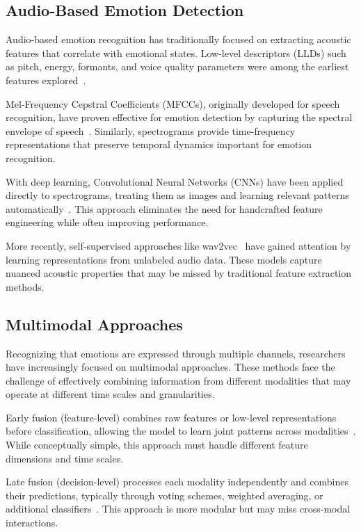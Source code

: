 \documentclass[12pt]{article}
\begin{document}
\subsection{Audio-Based Emotion Detection}
Audio-based emotion recognition has traditionally focused on extracting acoustic features that correlate with emotional states. Low-level descriptors (LLDs) such as pitch, energy, formants, and voice quality parameters were among the earliest features explored~\cite{schuller2009acoustic}.

Mel-Frequency Cepstral Coefficients (MFCCs), originally developed for speech recognition, have proven effective for emotion detection by capturing the spectral envelope of speech~\cite{li2013speech}. Similarly, spectrograms provide time-frequency representations that preserve temporal dynamics important for emotion recognition.

With deep learning, Convolutional Neural Networks (CNNs) have been applied directly to spectrograms, treating them as images and learning relevant patterns automatically~\cite{mao2014learning}. This approach eliminates the need for handcrafted feature engineering while often improving performance.

More recently, self-supervised approaches like wav2vec~\cite{schneider2019wav2vec} have gained attention by learning representations from unlabeled audio data. These models capture nuanced acoustic properties that may be missed by traditional feature extraction methods.

\subsection{Multimodal Approaches}
Recognizing that emotions are expressed through multiple channels, researchers have increasingly focused on multimodal approaches. These methods face the challenge of effectively combining information from different modalities that may operate at different time scales and granularities.

Early fusion (feature-level) combines raw features or low-level representations before classification, allowing the model to learn joint patterns across modalities~\cite{poria2017review}. While conceptually simple, this approach must handle different feature dimensions and time scales.

Late fusion (decision-level) processes each modality independently and combines their predictions, typically through voting schemes, weighted averaging, or additional classifiers~\cite{wagner2011introducting}. This approach is more modular but may miss cross-modal interactions.
\end{document}
